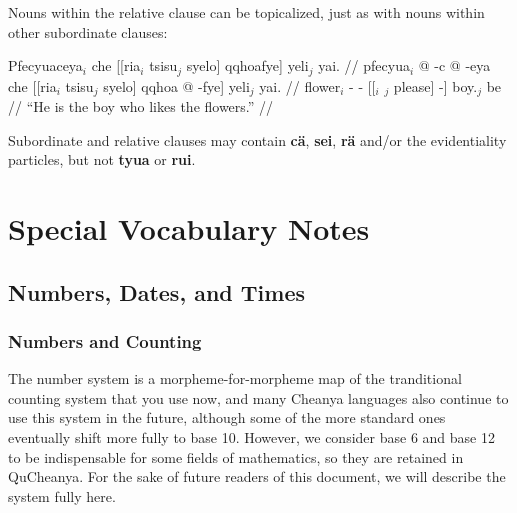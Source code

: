 \documentclass{article}
\begin{document}
Nouns within the relative clause can be topicalized, just as with nouns within other subordinate clauses:

\ex[lingstyle=QuCheanya] \begingl
\glpreamble Pfecyuaceya$_i$ che [[ria$_i$ tsisu$_j$ syelo] qqhoafye] yeli$_j$ yai. //
\gla pfecyua$_i$ @ -c @ -eya che [[ria$_i$ tsisu$_j$ syelo] qqhoa @ -fye] yeli$_j$ yai. //
\glb flower$_i$ - -  [[$_i$ $_j$ please]  -] boy.$_j$ be //
\glft ``He is the boy who likes the flowers.'' //
\endgl \xe

Subordinate and relative clauses may contain \textbf{c\"a}, \textbf{sei}, \textbf{r\"a} and/or the evidentiality particles, but not \textbf{tyua} or \textbf{rui}.

\section{Special Vocabulary Notes}
\subsection{Numbers, Dates, and Times}
\subsubsection{Numbers and Counting}

The number system is a morpheme-for-morpheme map of the tranditional counting system that you use now, and many Cheanya languages also continue to use this system in the future, although some of the more standard ones eventually shift more fully to base 10.  However, we consider base 6 and base 12 to be indispensable for some fields of mathematics, so they are retained in QuCheanya.  For the sake of future readers of this document, we will describe the system fully here.
\end{document}
